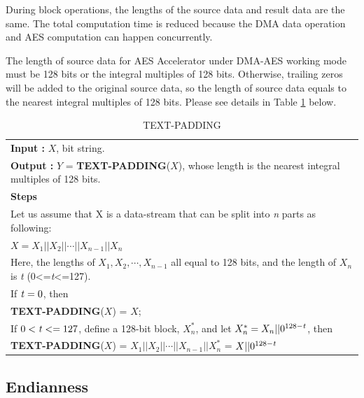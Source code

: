 \documentclass[main\_\_EN.tex]{subfiles}
\begin{document}
During block operations, the lengths of the source data and result data are the same. The total computation time is reduced because the DMA data operation and AES computation can happen concurrently.

\label{api:testpadding}The length of source data for AES Accelerator under DMA-AES working mode must be 128 bits or the integral multiples of 128 bits. Otherwise, trailing zeros will be added to the original source data, so the length of source data equals to the nearest integral multiples of 128 bits. Please see details in Table \ref{tab:aes-define-func-text-padding} below.


\begin{longtable}[c]{|p{15cm}|}
\caption{TEXT-PADDING} 
\label{tab:aes-define-func-text-padding}\\
\hline
\rowcolor{lightgray}
\multirow{1}{*}{%
{\bfseries Function :} {\bfseries TEXT-PADDING}(\ ) } \\\hline
{\bfseries Input\phantom{aaa} :} $X$, bit string.\\
{\bfseries Output\phantom{a~} :} $Y$ = {\bfseries TEXT-PADDING}($X$), whose length is the nearest integral multiples of 128 bits. \\\hline
{\bfseries Steps\phantom{aa~}  }\\
\hspace{1.3cm} Let us assume that X is a data-stream that can be split into {\it{n}} parts as following: \\
\phantom{aaaaaaaa}$X = X_{1} || X_{2} || \cdots || X_{n-1} || X_{n}$ \\
\phantom{aaaaaaaa}Here, the lengths of $X_{1}, X_{2}, \cdots, X_{n-1}$ all equal to 128 bits, and the length of $X_{n}$ is {\it{t}} (0<={\it{t}}<=127).\\
\phantom{aaaaaaaa}If ${\it{t}} = 0$, then\\
\phantom{aaaaaaaa}\phantom{aaaaaaaa} {\bfseries TEXT-PADDING}($X$) = $X$;\\
\phantom{aaaaaaaa}If $0<{\it{t}} <= 127$, define a 128-bit block, $X_{n}^{*}$, and let $X_{n}^{*} = X_{n} || 0^{128-{\it{t}}}$, then\\
\phantom{aaaaaaaa}\phantom{aaaaaaaa} {\bfseries TEXT-PADDING}($X$) = $X_{1} || X_{2} || \cdots || X_{n-1} || X_{n}^{*}$  = $X || 0^{128-{\it{t}}}$\\
\hline
\end{longtable}



\subsection{Endianness}
\end{document}
